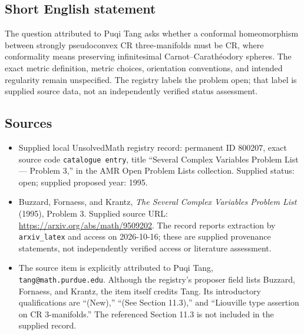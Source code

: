 \documentclass[11pt]{article}
\begin{document}
\subsection{Short English statement}
The question attributed to Puqi Tang asks whether a conformal homeomorphism between strongly pseudoconvex CR three-manifolds must be CR, where conformality means preserving infinitesimal Carnot--Carath\'eodory spheres. The exact metric definition, metric choices, orientation conventions, and intended regularity remain unspecified. The registry labels the problem open; that label is supplied source data, not an independently verified status assessment.
\subsection{Sources}
\begin{itemize}
\item Supplied local UnsolvedMath registry record: permanent ID \(800207\), exact source code \texttt{catalogue entry}, title ``Several Complex Variables Problem List --- Problem 3,'' in the AMR Open Problem Lists collection. Supplied status: open; supplied proposed year: 1995.
\item Buzzard, Fornaess, and Krantz, \emph{The Several Complex Variables Problem List} (1995), Problem 3. Supplied source URL: \url{https://arxiv.org/abs/math/9509202}. The record reports extraction by \texttt{arxiv\_latex} and access on 2026-10-16; these are supplied provenance statements, not independently verified access or literature assessment.
\item The source item is explicitly attributed to Puqi Tang, \texttt{tang@math.purdue.edu}. Although the registry's proposer field lists Buzzard, Fornaess, and Krantz, the item itself credits Tang. Its introductory qualifications are ``(New),'' ``(See Section 11.3),'' and ``Liouville type assertion on CR 3-manifolds.'' The referenced Section 11.3 is not included in the supplied record.
\end{itemize}
\end{document}
